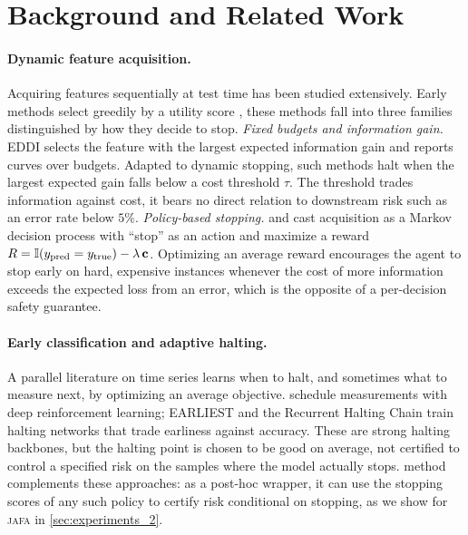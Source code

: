 \section{Background and Related Work}

\paragraph{Dynamic feature acquisition.}
Acquiring features sequentially at test time has been studied extensively. Early methods select greedily by a utility score \citep{utility2005}, these methods fall into three families distinguished by how they decide to stop. \emph{Fixed budgets and information gain.} EDDI \citep{EDDI} selects the feature with the largest expected information gain and reports curves over budgets. Adapted to dynamic stopping, such methods halt when the largest expected gain falls below a cost threshold $\tau$. The threshold trades information against cost, it bears no direct relation to downstream risk such as an error rate below $5\%$. \emph{Policy-based stopping.} \citet{jafa-2018} and \citet{difa_2023} cast acquisition as a Markov decision process with ``stop'' as an action and maximize a reward $R = \mathbb{I}(y_{\text{pred}} = y_{\text{true}}) - \lambda\,\mathbf{c}$. Optimizing an average reward encourages the agent to stop early on hard, expensive instances whenever the cost of more information exceeds the expected loss from an error, which is the opposite of a per-decision safety guarantee. 

\paragraph{Early classification and adaptive halting.}
A parallel literature on time series learns when to halt, and sometimes what to measure next, by optimizing an average objective. \citet{chang2019dynamic} schedule measurements with deep reinforcement learning; EARLIEST \citep{hartvigsen2019adaptive} and the Recurrent Halting Chain \citep{hartvigsen2020recurrent} train halting networks that trade earliness against accuracy. These are strong halting backbones, but the halting point is chosen to be good on average, not certified to control a specified risk on the samples where the model actually stops. 
\gls{method} complements these approaches: as a post-hoc wrapper, it can use the stopping scores of any such policy to certify risk conditional on stopping, as we show for \textsc{jafa} in \cref{sec:experiments_2}.

